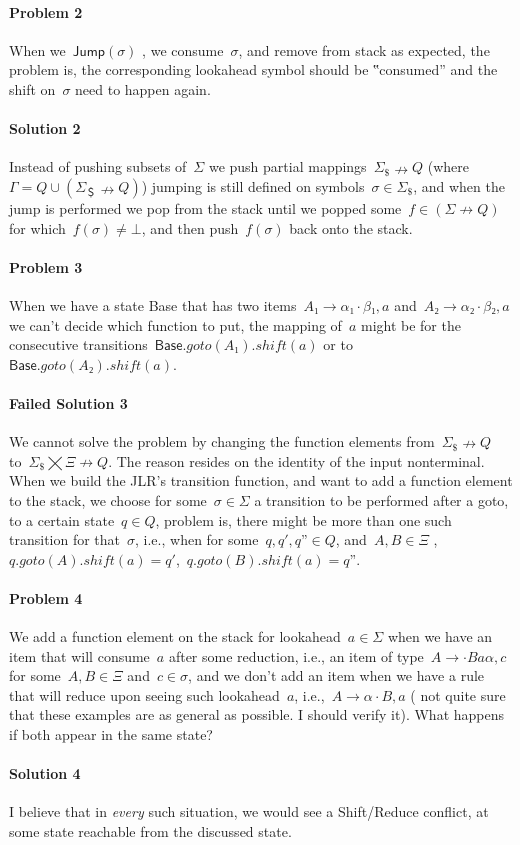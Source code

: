 \paragraph{Problem 2} When we~$\textsf{Jump}(σ)$ , we consume~$σ$, and remove
  from stack as expected, the problem is, the corresponding lookahead symbol
  should be ‟consumed” and the shift on~$σ$ need to happen again.

\paragraph{Solution 2} Instead of pushing subsets of~$Σ$ we push partial
  mappings~$Σ_{\$}↛Q$ (where~$Γ=Q∪(Σ_{＄}↛Q)$) jumping is still defined
  on symbols~$σ∈Σ_{\$}$, and when the jump is performed we pop from the stack
  until we popped some~$f∈(Σ↛Q)$ for which~$f(σ)≠⊥$, and then push~$f(σ)$ back onto the stack.

\paragraph{Problem 3} When we have a state \textsf{Base} that has
  two items~$A₁→α₁·β₁,a$ and~$A₂→α₂·β₂,a$ we can't decide which function to put,
  the mapping of~$a$ might be for the consecutive
  transitions~$\textsf{Base}.goto(A₁).shift(a)$ or to~$\textsf{Base}.goto(A₂).shift(a)$.

\paragraph{Failed Solution 3} We cannot solve the problem by changing the function elements from~$Σ_\$↛Q$
  to~$Σ_\$⨉Ξ↛Q$. The reason resides on the identity of the input nonterminal.
  When we build the JLR's transition function, and want to add a function element to the stack, we choose for some~$σ∈Σ$
  a transition to be performed after a goto, to a certain state~$q∈Q$, problem is, there might be more than one such transition
  for that~$σ$, i.e., when for some~$q,q',q”∈Q$, and~$A,B∈Ξ$ ,~$q.goto(A).shift(a)=q'$,~$q.goto(B).shift(a)=q”$.

\paragraph{Problem 4} We add a function element on the stack for lookahead~$a∈Σ$
  when we have an item that will consume~$a$ after some reduction,
  i.e., an item of type~$A→·Baα,c$ for some~$A,B∈Ξ$ and~$c∈σ$,
  and we don't add an item when we have a rule that will reduce
  upon seeing such lookahead~$a$, i.e.,~$A→α·B , a$
  ( not quite sure that these examples are as general as possible. I should verify it).
  What happens if both appear in the same state?

\paragraph{Solution 4} I believe that in \emph{every} such situation,
  we would see a Shift/Reduce conflict, at some state reachable from the discussed state.
